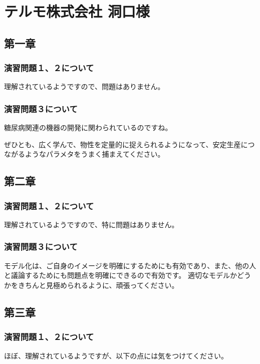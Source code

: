 \documentclass[uplatex,dvipdfmx,a4paper,11pt]{jsreport}
\begin{document}
\clearpage

\section*{テルモ株式会社 洞口様}
\subsection*{第一章}
\subsubsection*{演習問題１、２について}
理解されているようですので、問題はありません。

\subsubsection*{演習問題３について}

糖尿病関連の機器の開発に関わられているのですね。

ぜひとも、広く学んで、物性を定量的に捉えられるようになって、安定生産につながるようなパラメタをうまく捕まえてください。

\subsection*{第二章}
\subsubsection*{演習問題１、２について}
理解されているようですので、特に問題はありません。

\subsubsection*{演習問題３について}

モデル化は、ご自身のイメージを明確にするためにも有効であり、また、他の人と議論するためにも問題点を明確にできるので有効です。
適切なモデルかどうかをきちんと見極められるように、頑張ってください。

\subsection*{第三章}
\subsubsection*{演習問題１、２について}
ほぼ、理解されているようですが、以下の点には気をつけてください。
\end{document}
